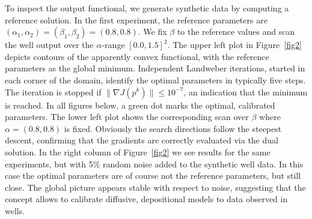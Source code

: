 To inspect the output functional, we generate synthetic data by
computing a reference solution.  In the first experiment, the
reference parameters are
$(\alpha_1, \alpha_2)=(\beta_1, \beta_2)=(0.8,0.8)$.  We fix $\beta$
to the reference values and scan the well output over the
$\alpha$-range $[0.0, 1.5]^2$. The upper left plot in
Figure~\ref{fig2} depicts contours of the apparently convex
functional, with the reference parameters as the global minimum.
Independent Landweber iterations, started in each corner of the domain,
identify the optimal parameters in typically five steps.  The
iteration is stopped if $\| \nabla J(p^k) \| \le 10^{-7}$, an
indication that the minimum is reached.  In all figures below, a green
dot marks the optimal, calibrated parameters.  The lower left plot
shows the corresponding scan over $\beta$ where $\alpha=(0.8,0.8)$ is
fixed.  Obviously the search directions follow the steepest descent,
confirming that the gradients are correctly evaluated via the dual
solution.  In the right column of Figure~\ref{fig2} we see results for
the same experiments, but with 5\% random noise added to the synthetic
well data. In this case the optimal parameters are of course not the
reference parameters, but still close.  The global picture appears
stable with respect to noise, suggesting that the concept allows to
calibrate diffusive, depositional models to data observed in wells.

